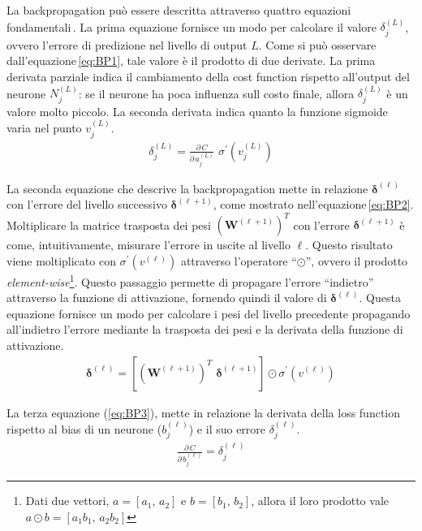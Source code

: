 La backpropagation può essere descritta attraverso quattro equazioni fondamentali\,\cite{nielsen2015neural}. La prima equazione fornisce un modo per calcolare il valore $\delta^{(L)}_j$, ovvero l'errore di predizione nel livello di output $L$. Come si può osservare dall'equazione\,\ref{eq:BP1}, tale valore è il prodotto di due derivate. La prima derivata parziale indica il cambiamento della cost function rispetto all'output del neurone $N^{(L)}_j$: se il neurone ha poca influenza sull costo finale, allora $\delta^{(L)}_j$ è un valore molto piccolo. La seconda derivata indica quanto la funzione sigmoide varia nel punto $v^{(L)}_j$.
% 
\begin{gather}
    \delta^{(L)}_j = \frac{\partial\,C}{\partial\,a^{(L)}_j} \,\, \sigma^\prime \left( v^{(L)}_j \right)
    \label{eq:BP1}
\end{gather}

La seconda equazione che descrive la backpropagation mette in relazione $\boldsymbol{\delta}^{(\ell)}$ con l'errore del livello successivo $\boldsymbol{\delta}^{(\ell + 1)}$, come mostrato nell'equazione\,\ref*{eq:BP2}. Moltiplicare la matrice trasposta dei pesi ${\left( \mathbf{W}^{(\ell + 1)} \right)}^T$ con l'errore $\boldsymbol{\delta}^{(\ell + 1)}$ è come, intuitivamente, misurare l'errore in uscite al livello $\ell$. Questo risultato viene moltiplicato con $\sigma^\prime \left( v^{(\ell)} \right)$ attraverso l'operatore ``$\odot$'', ovvero il prodotto \textit{element-wise}\footnote{Dati due vettori, $a = \left[ a_1,\,a_2\right]$ e $b = \left[ b_1,\,b_2\right]$, allora il loro prodotto vale $ a \odot b = \left[ a_1b_1,\,a_2b_2\right]$}. Questo passaggio permette di propagare l'errore ``indietro'' attraverso la funzione di attivazione, fornendo quindi il valore di $\boldsymbol{\delta}^{(\ell)}$. Questa equazione fornisce un modo per calcolare i pesi del livello precedente propagando all'indietro l'errore mediante la trasposta dei pesi e la derivata della funzione di attivazione.
% 
\begin{gather}
    \boldsymbol{\delta}^{(\ell)} = \left[ {\left( \mathbf{W}^{(\ell + 1)} \right)}^T \,\, \boldsymbol{\delta}^{(\ell + 1)} \right] \odot \sigma^\prime \left( v^{(\ell)} \right)
    \label{eq:BP2}
\end{gather}

La terza equazione (\ref{eq:BP3}), mette in relazione la derivata della loss function rispetto al bias di un neurone ($b^{(\ell)}_j$) e il suo errore $\delta^{(\ell)}_j$.
% 
\begin{gather}
    \frac{\partial\,C}{\partial\,b^{(\ell)}_j} = \delta^{(\ell)}_j
    \label{eq:BP3}
\end{gather}

